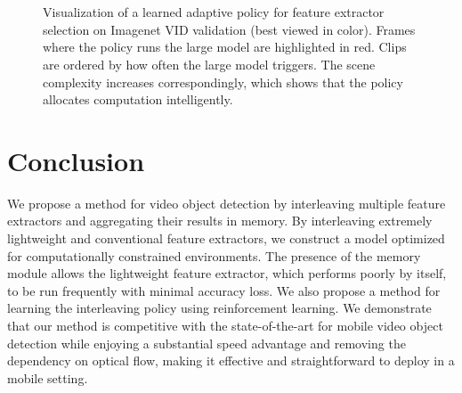 \documentclass[10pt,twocolumn,letterpaper]{article}
\begin{document}
\begin{figure*}[!htb]
{
}\\\vspace{-.5em}
\\\vspace{-0.5em}
\caption{Visualization of a learned adaptive policy for feature extractor selection on Imagenet VID validation (best viewed in color). Frames where the policy runs the large model are highlighted in red. Clips are ordered by how often the large model triggers. The scene complexity increases correspondingly, which shows that the policy allocates computation intelligently.}
\label{fig:visualization}
\end{figure*}


\section{Conclusion}
We propose a method for video object detection by interleaving multiple feature extractors and aggregating their results in memory. By interleaving extremely lightweight and conventional feature extractors, we construct a model optimized for computationally constrained environments. The presence of the memory module allows the lightweight feature extractor, which performs poorly by itself, to be run frequently with minimal accuracy loss. We also propose a method for learning the interleaving policy using reinforcement learning. We demonstrate that our method is competitive with the state-of-the-art for mobile video object detection while enjoying a substantial speed advantage and removing the dependency on optical flow, making it effective and straightforward to deploy in a mobile setting.


\clearpage


{\small


}
\end{document}
